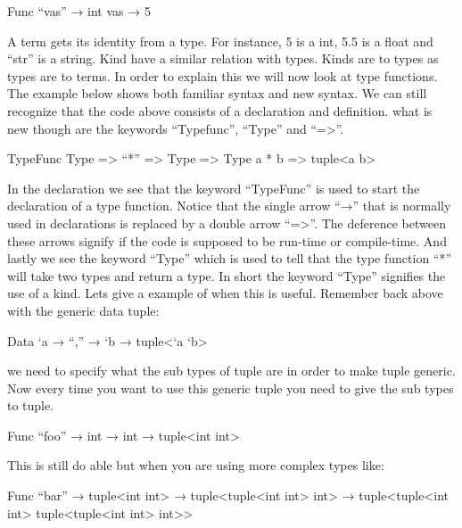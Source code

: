 \begin{code}
	Func “vas” → int
	vas → 5
\end{code}

A term gets its identity from a type. For instance, 5 is a int, 5.5 is a float and “str” is a string.
\linebreak
Kind have a similar relation with types. Kinds are to types as types are to terms. 
In order to explain this we will now look at type functions.
\linebreak
The example below shows both familiar syntax and new syntax. 
We can still recognize that the code above consists of a declaration and definition. 
what is new though are the keywords “Typefunc”, “Type” and “=>”.

\begin{code}
	TypeFunc Type => “*” => Type => Type
	a * b => tuple<a b>
\end{code}

In the declaration we see that the keyword “TypeFunc” is used to start the declaration of a type function. Notice that the single arrow “→” that is normally used in declarations is replaced by a double arrow “=>”. The deference between these arrows signify if the code is supposed to be run-time or compile-time. And lastly we see the keyword “Type” which is used to tell that the type function “*” will take two types and return a type.
\linebreak
In short the keyword “Type” signifies the use of a kind.
\linebreak
Lets give a example of when this is useful. Remember back above with the generic data tuple:

\begin{code}
	Data `a → “,” → `b → tuple<`a `b>
\end{code}

we need to specify what the sub types of tuple are in order to make tuple generic. Now every time you want to use this generic tuple you need to give the sub types to tuple.

\begin{code}
	Func “foo” → int → int → tuple<int int>
\end{code}

This is still do able but when you are using more complex types like:

\begin{code}
	Func “bar” → tuple<int int> → tuple<tuple<int int> int> → tuple<tuple<int int> tuple<tuple<int int> int>>
\end{code}

